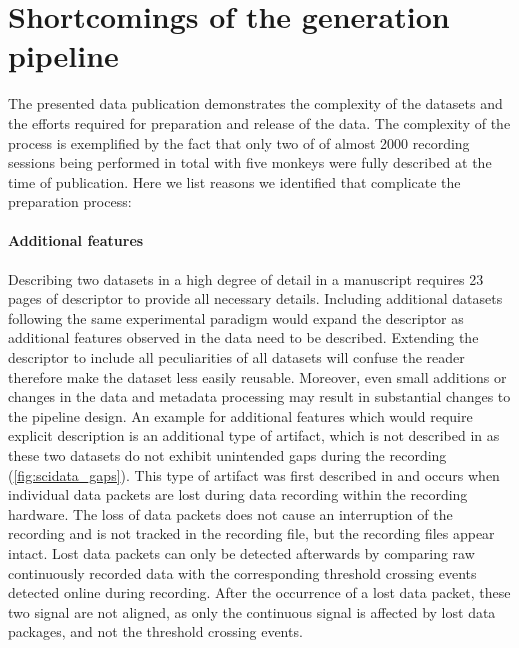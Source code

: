 \section{Shortcomings of the  generation pipeline}
\label{sec:scidata_shortcomings}
The presented data publication demonstrates the complexity of the datasets and the efforts required for preparation and release of the data. The complexity of the process is exemplified by the fact that only two of of almost 2000 recording sessions being performed in total with five monkeys were fully described at the time of publication. Here we list reasons we identified that complicate the preparation process:

\paragraph{Additional features}
\label{sec:additional_features_gaps}
Describing two datasets in a high degree of detail in a manuscript requires 23 pages of descriptor to provide all necessary details. Including additional datasets following the same experimental paradigm would expand the descriptor as additional features observed in the data need to be described. Extending the descriptor to include all peculiarities of all datasets will confuse the reader therefore make the dataset less easily reusable. Moreover, even small additions or changes in the data and metadata processing may result in substantial changes to the pipeline design.
An example for additional features which would require explicit description is an additional type of artifact, which is not described in \citet{Brochier_2018} as these two datasets do not exhibit unintended gaps during the recording (\cref{fig:scidata_gaps}). This type of artifact was first described in \citet{Sprenger_2014} and occurs when individual data packets are lost during data recording within the recording hardware. The loss of data packets does not cause an interruption of the recording and is not tracked in the recording file, but the recording files appear intact. Lost data packets can only be detected afterwards by comparing raw continuously recorded data with the corresponding threshold crossing events detected online during recording. After the occurrence of a lost data packet, these two signal are not aligned, as only the continuous signal is affected by lost data packages, and not the threshold crossing events.
